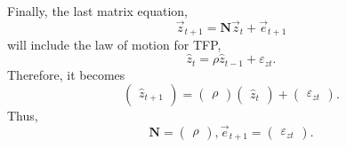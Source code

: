\documentclass[11pt]{article}
\numberwithin{equation}{section} %
\numberwithin{figure}{section} %
\numberwithin{table}{section} %
\theoremstyle{definition}
\begin{document}
Finally, the last matrix equation,
\[
    \vec{z}_{t+1} = \mathbf{N} \vec{z}_t + \vec{e}_{t+1}
\]
will include the law of motion for TFP,
\[
    \hat{z}_t = \rho \hat{z}_{t-1} + \varepsilon_{zt}.
\]
Therefore, it becomes
\[
    \begin{pmatrix}
        \hat{z}_{t+1}
    \end{pmatrix} = \begin{pmatrix}
        \rho
    \end{pmatrix} \begin{pmatrix}
        \hat{z}_t
    \end{pmatrix} + \begin{pmatrix}
        \varepsilon_{zt}
    \end{pmatrix}.
\]
Thus,
\[
    \mathbf{N} = \begin{pmatrix}
        \rho
    \end{pmatrix}, \vec{e}_{t+1} = \begin{pmatrix}
        \varepsilon_{zt}
    \end{pmatrix}.
\]
\end{document}
